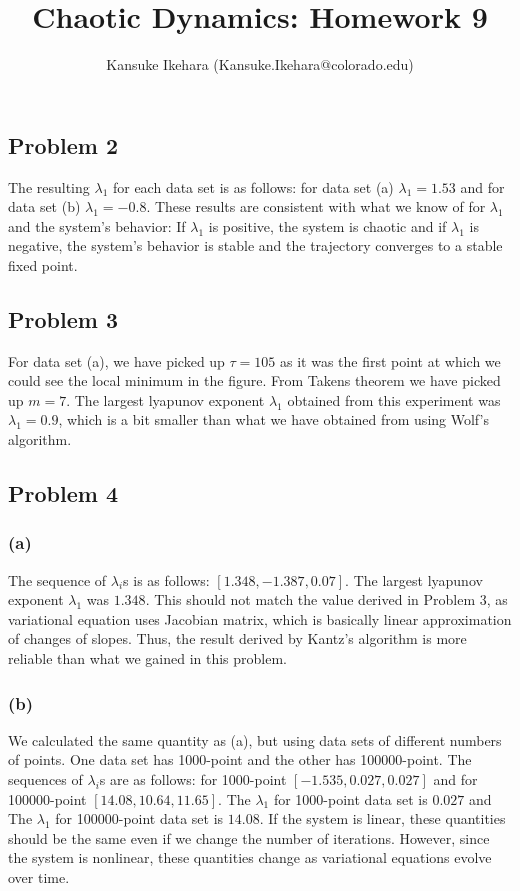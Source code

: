 \documentclass{article}
\title{Chaotic Dynamics: Homework 9}
\author{Kansuke Ikehara (Kansuke.Ikehara@colorado.edu)}
\begin{document}
\maketitle

\subsection*{Problem 2}
The resulting $\lambda_{1}$ for each data set is as follows: for data set (a) $\lambda_{1} = 1.53$ and for data set (b) $\lambda_{1} = -0.8$. These results are consistent with what we know of for $\lambda_{1}$ and the system's behavior: If $\lambda_{1}$ is positive, the system is chaotic and if $\lambda_{1}$ is negative, the system's behavior is stable and the trajectory converges to a stable fixed point.

\subsection*{Problem 3}
For data set (a), we have picked up $\tau = 105$ as it was the first point at which we could see the local minimum in the figure. From Takens theorem we have picked up $m = 7$. The largest lyapunov exponent $\lambda_{1}$ obtained from this experiment was $\lambda_{1} = 0.9$, which is a bit smaller than what we have obtained from using Wolf's algorithm.

\subsection*{Problem 4}
\subsubsection*{(a)}
The sequence of $\lambda_{i}$s is as follows: $[1.348, -1.387,  0.07]$.
The largest lyapunov exponent $\lambda_{1}$ was $1.348$. This should not match the value derived in Problem 3, as variational equation uses Jacobian matrix, which is basically linear approximation of changes of slopes. Thus, the result derived by Kantz's algorithm is more reliable than what we gained in this problem.

\subsubsection*{(b)}
We calculated the same quantity as (a), but using data sets of different numbers of points. One data set has 1000-point and the other has 100000-point. The sequences of $\lambda_{i}$s are as follows: for 1000-point $[-1.535,  0.027,  0.027]$ and for 100000-point $[14.08,  10.64,  11.65]$. The $\lambda_{1}$ for 1000-point data set is $0.027$ and The $\lambda_{1}$ for 100000-point data set is $14.08$. If the system is linear, these quantities should be the same even if we change the number of iterations. However, since the system is nonlinear, these quantities change as variational equations evolve over time.
\end{document}
